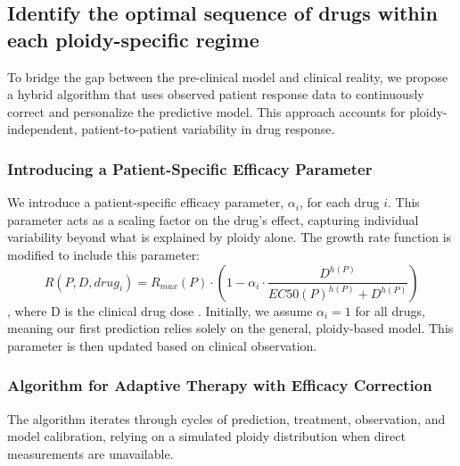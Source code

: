 \documentclass{article}
\begin{document}

  
\subsection{Identify the optimal sequence of drugs within each ploidy-specific regime}

To bridge the gap between the pre-clinical model and clinical reality, we propose a hybrid algorithm that uses observed patient response data to continuously correct and personalize the predictive model. This approach accounts for ploidy-independent, patient-to-patient variability in drug response.

\subsubsection*{Introducing a Patient-Specific Efficacy Parameter}
We introduce a patient-specific efficacy parameter, $\alpha_i$, for each drug $i$. This parameter acts as a scaling factor on the drug's effect, capturing individual variability beyond what is explained by ploidy alone. The growth rate function is modified to include this parameter:
$$
R(P, D, drug_i) = R_{max}(P) \cdot \left(1 - \alpha_i \cdot \frac{D^{h(P)}}{EC50(P)^{h(P)} + D^{h(P)}}\right)
$$
\color{blue}, where D is the clinical drug dose \color{black}. Initially, we assume $\alpha_i = 1$ for all drugs, meaning our first prediction relies solely on the general, ploidy-based model. This parameter is then updated based on clinical observation.

\subsubsection*{Algorithm for Adaptive Therapy with Efficacy Correction}
The algorithm iterates through cycles of prediction, treatment, observation, and model calibration, relying on a simulated ploidy distribution when direct measurements are unavailable.
\end{document}

